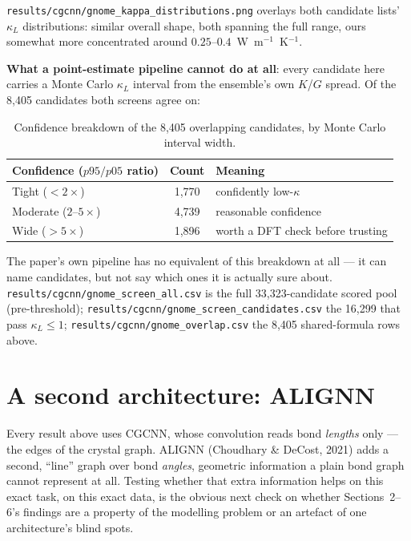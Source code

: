 \documentclass[11pt,a4paper]{article}
\begin{document}
\noindent
\texttt{results/cgcnn/gnome\_kappa\_distributions.png} overlays both candidate
lists' $\kappa_L$ distributions: similar overall shape, both spanning the full
range, ours somewhat more concentrated around $0.25$--$0.4$~W~m$^{-1}$~K$^{-1}$.

\textbf{What a point-estimate pipeline cannot do at all}: every candidate here
carries a Monte Carlo $\kappa_L$ interval from the ensemble's own $K$/$G$
spread. Of the 8{,}405 candidates both screens agree on:

\begin{table}[h]
\centering
\caption{Confidence breakdown of the 8,405 overlapping candidates, by Monte Carlo interval width.}
\begin{tabular}{lcl}
\toprule
Confidence ($p95/p05$ ratio) & Count & Meaning \\
\midrule
Tight ($< 2\times$) & 1{,}770 & confidently low-$\kappa$ \\
Moderate ($2$--$5\times$) & 4{,}739 & reasonable confidence \\
Wide ($> 5\times$) & 1{,}896 & worth a DFT check before trusting \\
\bottomrule
\end{tabular}
\end{table}

\noindent
The paper's own pipeline has no equivalent of this breakdown at all --- it can
name candidates, but not say which ones it is actually sure about.
\texttt{results/cgcnn/gnome\_screen\_all.csv} is the full 33{,}323-candidate scored
pool (pre-threshold); \texttt{results/cgcnn/gnome\_screen\_candidates.csv} the
16{,}299 that pass $\kappa_L \leq 1$; \texttt{results/cgcnn/gnome\_overlap.csv} the
8{,}405 shared-formula rows above.

\section{A second architecture: ALIGNN}

Every result above uses CGCNN, whose convolution reads bond \emph{lengths}
only --- the edges of the crystal graph. ALIGNN (Choudhary \& DeCost, 2021)
adds a second, ``line'' graph over bond \emph{angles}, geometric information
a plain bond graph cannot represent at all. Testing whether that extra
information helps on this exact task, on this exact data, is the obvious
next check on whether Sections~2--6's findings are a property of the
modelling problem or an artefact of one architecture's blind spots.
\end{document}
